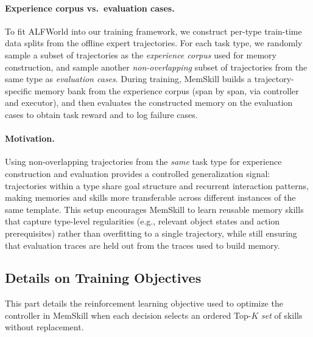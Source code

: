\paragraph{Experience corpus vs.\ evaluation cases.}
To fit ALFWorld into our training framework, we construct per-type train-time data splits from the offline expert trajectories. For each task type, we randomly sample a subset of trajectories as the \emph{experience corpus} used for memory construction, and sample another \emph{non-overlapping} subset of trajectories from the same type as \emph{evaluation cases}. During training, MemSkill builds a trajectory-specific memory bank from the experience corpus (span by span, via controller and executor), and then evaluates the constructed memory on the evaluation cases to obtain task reward and to log failure cases.

\paragraph{Motivation.}
Using non-overlapping trajectories from the \emph{same} task type for experience construction and evaluation provides a controlled generalization signal: trajectories within a type share goal structure and recurrent interaction patterns, making memories and skills more transferable across different instances of the same template. This setup encourages MemSkill to learn reusable memory skills that capture type-level regularities (e.g., relevant object states and action prerequisites) rather than overfitting to a single trajectory, while still ensuring that evaluation traces are held out from the traces used to build memory.









\subsection{Details on Training Objectives}
\label{appendix:rl_objective}



This part details the reinforcement learning objective used to optimize the controller in MemSkill when each decision selects an ordered Top-$K$ \emph{set} of skills without replacement.

